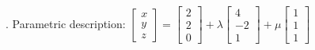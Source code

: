 . Parametric description:
\newline
$\begin{bmatrix} x \\ y \\ z\end{bmatrix} = \begin{bmatrix} 2 \\ 2 \\ 0\end{bmatrix} + \lambda \begin{bmatrix} 4 \\ -2 \\ 1 \end{bmatrix} + \mu \begin{bmatrix} 1 \\ 1 \\ 1\end{bmatrix}$